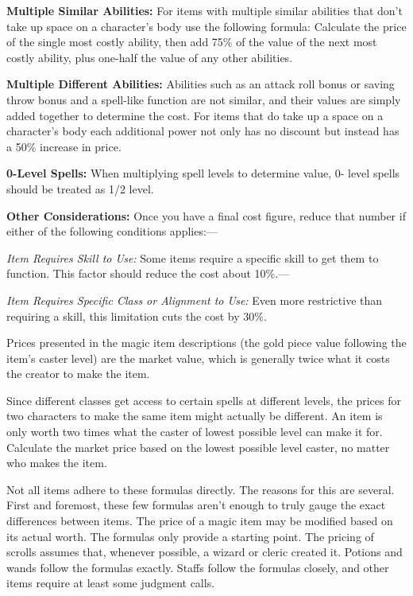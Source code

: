 \textbf{Multiple Similar Abilities: }For items with multiple similar abilities 
that don't take up space on a character's body use the following formula: Calculate 
the price of the single most costly ability, then add 75\% of the value of the 
next most costly ability, plus one-half the value of any other abilities.

\textbf{Multiple Different Abilities: }Abilities such as an attack roll bonus or 
saving throw bonus and a spell-like function are not similar, and their values 
are simply added together to determine the cost. For items that do take up a space 
on a character's body each additional power not only has no discount but instead 
has a 50\% increase in price.

\textbf{0-Level Spells: }When multiplying spell levels to determine value, 0- level 
spells should be treated as 1/2 level.

\textbf{Other Considerations: }Once you have a final cost figure, reduce that number 
if either of the following conditions applies:---

\textit{Item Requires Skill to Use: }Some items require a specific skill to get 
them to function. This factor should reduce the cost about 10\%.---

\textit{Item Requires Specific Class or Alignment to Use: }Even more restrictive 
than requiring a skill, this limitation cuts the cost by 30\%.

Prices presented in the magic item descriptions (the gold piece value following 
the item's caster level) are the market value, which is generally twice what it 
costs the creator to make the item.

Since different classes get access to certain spells at different levels, the prices 
for two characters to make the same item might actually be different. An item is 
only worth two times what the caster of lowest possible level can make it for. 
Calculate the market price based on the lowest possible level caster, no matter 
who makes the item.

Not all items adhere to these formulas directly. The reasons for this are several. 
First and foremost, these few formulas aren't enough to truly gauge the exact differences 
between items. The price of a magic item may be modified based on its actual worth. 
The formulas only provide a starting point. The pricing of scrolls assumes that, 
whenever possible, a wizard or cleric created it. Potions and wands follow the 
formulas exactly. Staffs follow the formulas closely, and other items require at 
least some judgment calls.

